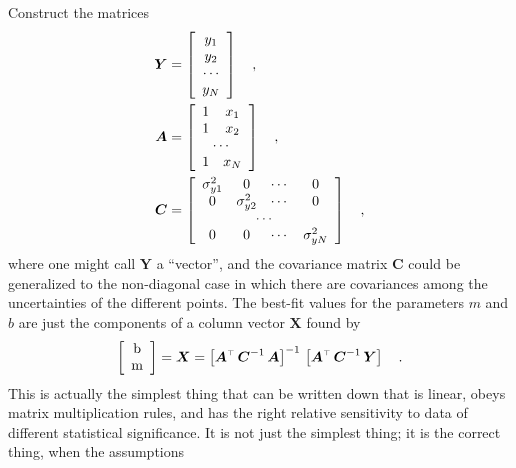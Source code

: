 \documentclass[12pt,twoside]{article}
\newcommand{\mmatrix}[1]{\boldsymbol{#1}}
\newcommand{\inverse}[1]{{#1}^{-1}}
\newcommand{\transpose}[1]{{#1}^{\scriptscriptstyle \top}}
\newcommand{\mA}{\mmatrix{A}}
\newcommand{\mAT}{\transpose{\mA}}
\newcommand{\mC}{\mmatrix{C}}
\newcommand{\mCinv}{\inverse{\mC}}
\newcommand{\mX}{\mmatrix{X}}
\newcommand{\mY}{\mmatrix{Y}}
\begin{document}
Construct the matrices
\begin{align}\label{eq:mY}
\mY &= \left[\begin{array}{c}
y_1 \\
y_2 \\
\cdots \\
y_N
\end{array}\right] \quad ,\\
\mA &= \left[\begin{array}{cc}
1 & x_1 \\
1 & x_2 \\
\multicolumn{2}{c}{\cdots} \\
1 & x_N
\end{array}\right] \quad ,\\
\mC & = \left[\begin{array}{cccc}
\sigma_{y1}^{2} & 0 & \cdots & 0 \\
0 & \sigma_{y2}^{2} & \cdots & 0 \\
\multicolumn{4}{c}{\cdots} \\
0 & 0 & \cdots & \sigma_{yN}^{2}
\end{array}\right] \quad ,\label{eq:covar}
\end{align}
where one might call $\mY$ a ``vector'', and the covariance matrix
$\mC$ could be generalized to the non-diagonal case in which there are
covariances among the uncertainties of the different points.  The
best-fit values for the parameters $m$ and $b$ are just the components
of a column vector $\mX$ found by
\begin{equation}\label{eq:lsf}
\left[\begin{array}{c} $b$ \\ $m$ \end{array}\right]
 = \mX = \inverse{\left[\mAT\,\mCinv\,\mA\right]}
  \,\left[\mAT\,\mCinv\,\mY\right] \quad .
\end{equation}
This is actually the simplest thing that can be written down that is
linear, obeys matrix multiplication rules, and has the right relative
sensitivity to data of different statistical significance.  It is not
just the simplest thing; it is the correct thing, when the assumptions
\end{document}
